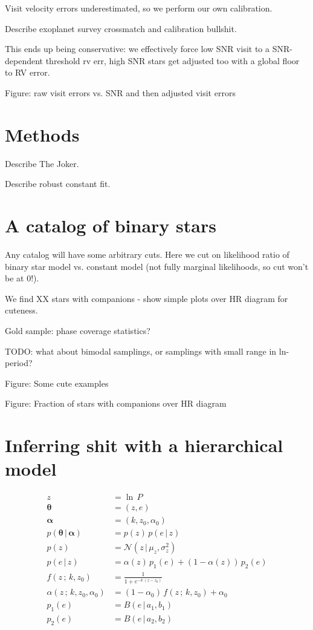 \documentclass[modern]{aastex62}
\newcommand{\given}{\,|\,}
\newcommand{\norm}{\mathcal{N}}
\newcommand{\bs}[1]{\boldsymbol{#1}}
\begin{document}
Visit velocity errors underestimated, so we perform our own calibration.

Describe exoplanet survey crossmatch and calibration bullshit.

This ends up being conservative: we effectively force low SNR visit to a SNR-dependent threshold rv err, high SNR stars get adjusted too with a global floor to RV error.

Figure: raw visit errors vs. SNR and then adjusted visit errors


\section{Methods} \label{sec:methods}

Describe The Joker.

Describe robust constant fit.

\section{A catalog of binary stars} \label{sec:catalog}

Any catalog will have some arbitrary cuts. Here we cut on likelihood ratio of binary star model vs. constant model (not fully marginal likelihoods, so cut won't be at 0!).

We find XX stars with companions - show simple plots over HR diagram for cuteness.

Gold sample: phase coverage statistics?

TODO: what about bimodal samplings, or samplings with small range in ln-period?

Figure: Some cute examples

Figure: Fraction of stars with companions over HR diagram

\section{Inferring shit with a hierarchical model} \label{sec:Pe}

\begin{align}
    z &= \ln\,P\\
    \bs{\theta} &= (z, e)\\
    \bs{\alpha} &= (k, z_0, \alpha_0)\\
    p(\bs{\theta} \given \bs{\alpha}) &= p(z) \, p(e \given z)\\
    p(z) &= \norm\left(z \given \mu_z, \sigma_z^2 \right)\\
    p(e \given z) &= \alpha(z) \, p_1(e) + (1-\alpha(z)) \, p_2(e)\\
    f(z\,;\,k,z_0) &= \frac{1}{1 + e^{-k\,(z - z_0)}}\\
    \alpha(z \,;\, k, z_0, \alpha_0) &= (1-\alpha_0) \, f(z \,;\, k, z_0) + \alpha_0\\
    p_1(e) &= B(e \given a_1, b_1)\\
    p_2(e) &= B(e \given a_2, b_2)
\end{align}
\end{document}
